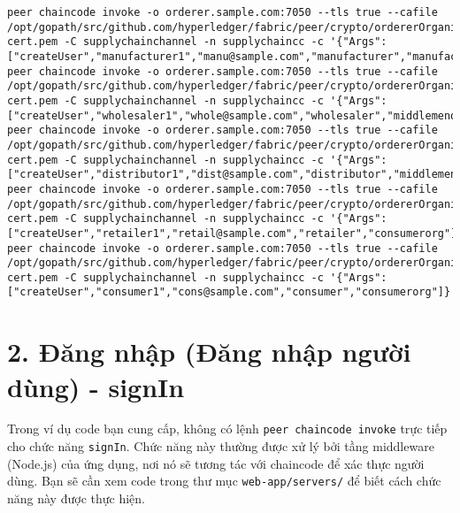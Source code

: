 \documentclass{article}
\begin{document}
\begin{lstlisting}[breaklines=true]
peer chaincode invoke -o orderer.sample.com:7050 --tls true --cafile /opt/gopath/src/github.com/hyperledger/fabric/peer/crypto/ordererOrganizations/sample.com/orderers/orderer.sample.com/msp/tlscacerts/tlsca.sample.com-cert.pem -C supplychainchannel -n supplychaincc -c '{"Args":["createUser","manufacturer1","manu@sample.com","manufacturer","manufacturerorg"]}'
peer chaincode invoke -o orderer.sample.com:7050 --tls true --cafile /opt/gopath/src/github.com/hyperledger/fabric/peer/crypto/ordererOrganizations/sample.com/orderers/orderer.sample.com/msp/tlscacerts/tlsca.sample.com-cert.pem -C supplychainchannel -n supplychaincc -c '{"Args":["createUser","wholesaler1","whole@sample.com","wholesaler","middlemenorg"]}'
peer chaincode invoke -o orderer.sample.com:7050 --tls true --cafile /opt/gopath/src/github.com/hyperledger/fabric/peer/crypto/ordererOrganizations/sample.com/orderers/orderer.sample.com/msp/tlscacerts/tlsca.sample.com-cert.pem -C supplychainchannel -n supplychaincc -c '{"Args":["createUser","distributor1","dist@sample.com","distributor","middlemenorg"]}'
peer chaincode invoke -o orderer.sample.com:7050 --tls true --cafile /opt/gopath/src/github.com/hyperledger/fabric/peer/crypto/ordererOrganizations/sample.com/orderers/orderer.sample.com/msp/tlscacerts/tlsca.sample.com-cert.pem -C supplychainchannel -n supplychaincc -c '{"Args":["createUser","retailer1","retail@sample.com","retailer","consumerorg"]}'
peer chaincode invoke -o orderer.sample.com:7050 --tls true --cafile /opt/gopath/src/github.com/hyperledger/fabric/peer/crypto/ordererOrganizations/sample.com/orderers/orderer.sample.com/msp/tlscacerts/tlsca.sample.com-cert.pem -C supplychainchannel -n supplychaincc -c '{"Args":["createUser","consumer1","cons@sample.com","consumer","consumerorg"]}'
\end{lstlisting}

\section{2. Đăng nhập (Đăng nhập người dùng) - signIn}

Trong ví dụ code bạn cung cấp, không có lệnh \texttt{peer chaincode invoke} trực tiếp cho chức năng \texttt{signIn}. Chức năng này thường được xử lý bởi tầng middleware (Node.js) của ứng dụng, nơi nó sẽ tương tác với chaincode để xác thực người dùng. Bạn sẽ cần xem code trong thư mục \texttt{web-app/servers/} để biết cách chức năng này được thực hiện.
\end{document}

